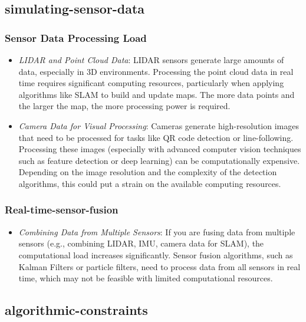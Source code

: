 \documentclass[../../main]{subfiles}
\begin{document}
    \subsection{simulating-sensor-data}

    \subsubsection{Sensor Data Processing Load}
    \begin{itemize}
    \item
      \emph{LIDAR and Point Cloud Data}: LIDAR sensors generate large
      amounts of data, especially in 3D environments. Processing the point
      cloud data in real time requires significant computing resources,
      particularly when applying algorithms like SLAM to build and update
      maps. The more data points and the larger the map, the more processing
      power is required.
    \item
      \emph{Camera Data for Visual Processing}: Cameras generate
      high-resolution images that need to be processed for tasks like QR
      code detection or line-following. Processing these images (especially
      with advanced computer vision techniques such as feature detection or
      deep learning) can be computationally expensive. Depending on the
      image resolution and the complexity of the detection algorithms, this
      could put a strain on the available computing resources.
    \end{itemize}
    
    \subsubsection{Real-time-sensor-fusion}
    
    \begin{itemize}
    \item
      \emph{Combining Data from Multiple Sensors}: If you are fusing data
      from multiple sensors (e.g., combining LIDAR, IMU, camera data for
      SLAM), the computational load increases significantly. Sensor fusion
      algorithms, such as Kalman Filters or particle filters, need to
      process data from all sensors in real time, which may not be feasible
      with limited computational resources.
    \end{itemize}
    
    \subsection{algorithmic-constraints}
    
\end{document}
